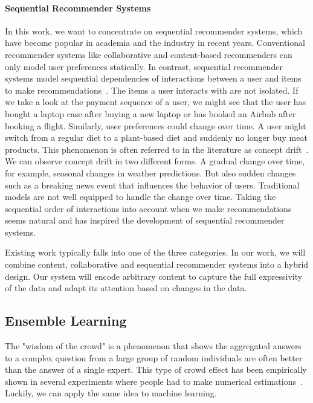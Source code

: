 \paragraph{Sequential Recommender Systems}
In this work, we want to concentrate on sequential recommender systems, which have become popular in academia and the industry in recent years. Conventional recommender systems like collaborative and content-based recommenders can only model user preferences statically. In contrast, sequential recommender systems model sequential dependencies of interactions between a user and items to make recommendations~\cite{wang2019survey, wang2019sequential}. The items a user interacts with are not isolated. If we take a look at the payment sequence of a user, we might see that the user has bought a laptop case after buying a new laptop or has booked an Airbnb after booking a flight. Similarly, user preferences could change over time. A user might switch from a regular diet to a plant-based diet and suddenly no longer buy meat products. This phenomenon is often referred to in the literature as concept drift~\cite{tsymbal2004problem}. We can observe concept drift in two different forms. A gradual change over time, for example, seasonal changes in weather predictions. But also sudden changes such as a breaking news event that influences the behavior of users. Traditional models are not well equipped to handle the change over time. Taking the sequential order of interactions into account when we make recommendations seems natural and has inspired the development of sequential recommender systems.

Existing work typically falls into one of the three categories.
In our work, we will combine content, collaborative and sequential recommender systems into a hybrid design. Our system will encode arbitrary content to capture the full expressivity of the data and adapt its attention based on changes in the data.

\subsection{Ensemble Learning}

The "wisdom of the crowd" is a phenomenon that shows the aggregated answers to a complex question from a large group of random individuals are often better than the answer of a single expert. This type of crowd effect has been empirically shown in several experiments where people had to make numerical estimations~\cite{yi2012wisdom}. Luckily, we can apply the same idea to machine learning.

